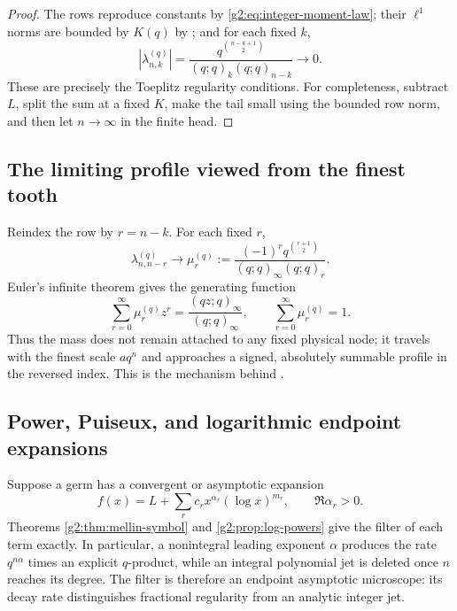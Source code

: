 \begin{proof}
The rows reproduce constants by \eqref{g2:eq:integer-moment-law}; their
$\ell^1$ norms are bounded by $K(q)$ by ; and for each fixed
$k$,
\[
 |\lambda_{n,k}^{(q)}|
 =\frac{q^{\binom{n-k+1}{2}}}
 {(q;q)_k(q;q)_{n-k}}\longrightarrow0.
\]
These are precisely the Toeplitz regularity conditions.  For completeness,
subtract $L$, split the sum at a fixed $K$, make the tail small using the
bounded row norm, and then let $n\to\infty$ in the finite head.
\end{proof}

\subsection{The limiting profile viewed from the finest tooth}

Reindex the row by $r=n-k$.  For each fixed $r$,
\begin{equation}
 \lambda_{n,n-r}^{(q)}
 \longrightarrow
 \mu_r^{(q)}
 :=\frac{(-1)^rq^{\binom{r+1}{2}}}
 {(q;q)_\infty(q;q)_r}.
 \label{g2:eq:limiting-row-profile}
\end{equation}
Euler's infinite theorem gives the generating function
\begin{equation}
 \sum_{r=0}^\infty\mu_r^{(q)}z^r
 =\frac{(qz;q)_\infty}{(q;q)_\infty},
 \qquad
 \sum_{r=0}^\infty\mu_r^{(q)}=1.
 \label{g2:eq:limiting-profile-generating}
\end{equation}
Thus the mass does not remain attached to any fixed physical node; it travels
with the finest scale $aq^n$ and approaches a signed, absolutely summable
profile in the reversed index.  This is the mechanism behind
.

\subsection{Power, Puiseux, and logarithmic endpoint expansions}

Suppose a germ has a convergent or asymptotic expansion
\[
 f(x)=L+\sum_{r}c_rx^{\alpha_r}(\log x)^{m_r},
 \qquad \Re\alpha_r>0.
\]
Theorems \ref{g2:thm:mellin-symbol} and \ref{g2:prop:log-powers} give the filter of
each term exactly.  In particular, a nonintegral leading exponent $\alpha$
produces the rate $q^{n\alpha}$ times an explicit $q$-product, while an
integral polynomial jet is deleted once $n$ reaches its degree.  The filter is
therefore an endpoint asymptotic microscope: its decay rate distinguishes
fractional regularity from an analytic integer jet.

